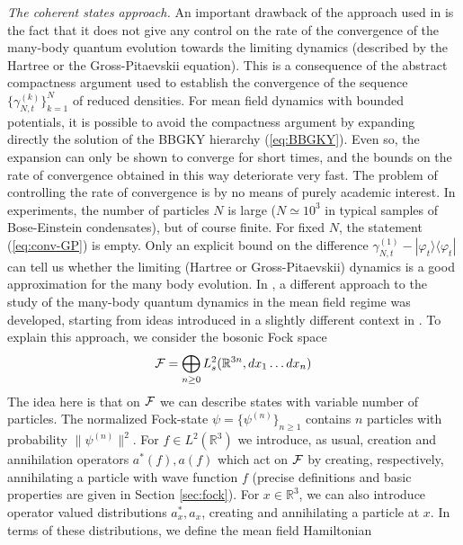 \documentclass[11pt,a4paper,DIV11]{scrartcl}	%
\newcommand{\bR}{{\mathbb R}}
\newcommand{\tr}{\mbox{Tr}}
\newcommand{\cF}{{\cal F}}
\begin{document}
\bigskip

{\it The coherent states approach.} An important drawback of the approach used in \cite{S,EY,ES,ESY1,ESY2,ESY3,ESY4} is the fact that it does not give any control on the rate of the convergence of the many-body quantum evolution towards the limiting dynamics (described by the Hartree or the Gross-Pitaevskii equation). This is a consequence of the abstract compactness argument used to establish the convergence of the sequence $\{ \gamma^{(k)}_{N,t} \}_{k=1}^N$ of reduced densities. For mean field dynamics with bounded potentials, it is possible to avoid the compactness argument by expanding directly the solution of the BBGKY hierarchy (\ref{eq:BBGKY}).
Even so, the expansion can only be shown to converge for short times, and the bounds on the rate of convergence obtained in this way deteriorate very fast. 
The problem of controlling the rate of convergence is by no means of purely academic interest. In experiments, the number of particles $N$ is large ($N \simeq 10^3$ in typical samples of Bose-Einstein condensates), but of course finite. For fixed $N$, the statement (\ref{eq:conv-GP}) is empty. Only an explicit  bound on the difference $\gamma^{(1)}_{N,t} - |\varphi_t \rangle \langle \varphi_t|$ can tell us whether the limiting (Hartree or Gross-Pitaevskii) dynamics is a good approximation for the many body evolution. In \cite{RS}, a different approach to the study of the many-body quantum dynamics in the mean field regime was developed, starting from ideas introduced in a slightly different context in \cite{H,GV}. 
To explain this approach, we consider the bosonic Fock space 
\[ \cF = \bigoplus_{n \geq 0} L^2_s (\bR^{3n} , dx_1 \dots  dx_n) \]
The idea here is that on $\cF$ we can describe states with variable number of particles. The normalized Fock-state $\psi = \{ \psi^{(n)} \}_{n\geq 1}$ contains $n$ particles with probability $\| \psi^{(n)} \|^2$. For $f \in L^2 (\bR^3)$ we introduce, as usual, creation and annihilation operators $a^* (f), a(f)$ which act on $\cF$ by creating, respectively, annihilating a particle with wave function $f$ (precise definitions and basic properties are given in Section \ref{sec:fock}). For $x \in \bR^3$, we can also introduce operator valued distributions $a_x^*, a_x$, creating and annihilating a particle at $x$. In terms of these distributions, we define the mean field Hamiltonian
\end{document}
